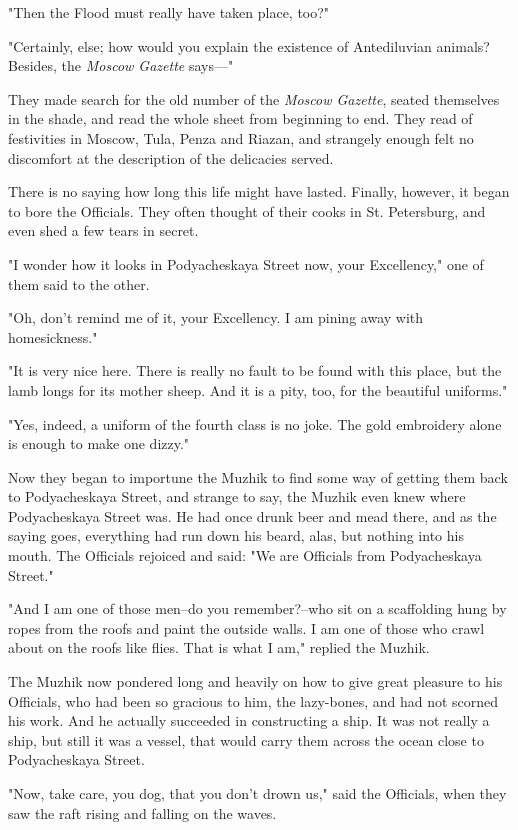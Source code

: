 "Then the Flood must really have taken place, too?"

"Certainly, else; how would you explain the existence of Antediluvian
animals? Besides, the \emph{Moscow Gazette} says---"

They made search for the old number of the \emph{Moscow Gazette}, seated
themselves in the shade, and read the whole sheet from beginning to
end. They read of festivities in Moscow, Tula, Penza and Riazan, and
strangely enough felt no discomfort at the description of the
delicacies served.

There is no saying how long this life might have lasted. Finally,
however, it began to bore the Officials. They often thought of their
cooks in St. Petersburg, and even shed a few tears in secret.

"I wonder how it looks in Podyacheskaya Street now, your Excellency,"
one of them said to the other.

"Oh, don't remind me of it, your Excellency. I am pining away with
homesickness."

"It is very nice here. There is really no fault to be found with this
place, but the lamb longs for its mother sheep. And it is a pity, too,
for the beautiful uniforms."

"Yes, indeed, a uniform of the fourth class is no joke. The gold
embroidery alone is enough to make one dizzy."

Now they began to importune the Muzhik to find some way of getting
them back to Podyacheskaya Street, and strange to say, the Muzhik even
knew where Podyacheskaya Street was. He had once drunk beer and mead
there, and as the saying goes, everything had run down his beard,
alas, but nothing into his mouth. The Officials rejoiced and said: "We
are Officials from Podyacheskaya Street."

"And I am one of those men--do you remember?--who sit on a scaffolding
hung by ropes from the roofs and paint the outside walls. I am one of
those who crawl about on the roofs like flies. That is what I am,"
replied the Muzhik.

The Muzhik now pondered long and heavily on how to give great pleasure
to his Officials, who had been so gracious to him, the lazy-bones, and
had not scorned his work. And he actually succeeded in constructing a
ship. It was not really a ship, but still it was a vessel, that would
carry them across the ocean close to Podyacheskaya Street.

"Now, take care, you dog, that you don't drown us," said the
Officials, when they saw the raft rising and falling on the waves.


